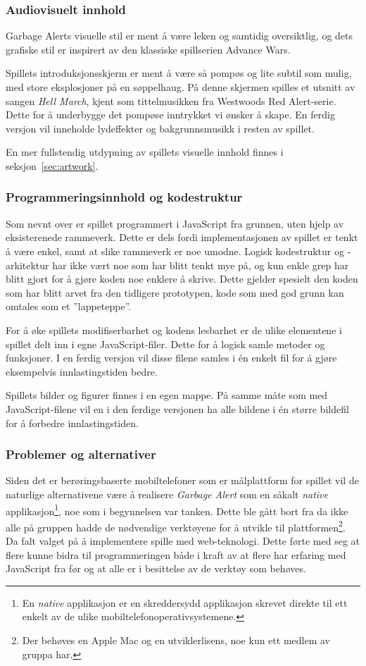 \subsubsection{Audiovisuelt innhold}
{Garbage Alerts} visuelle stil er ment å være leken og samtidig
oversiktlig, og dets grafiske stil er inspirert av den klassiske
spillserien Advance Wars.

Spillets introduksjonsskjerm er ment å være så pompøs og lite subtil som
mulig, med store eksplosjoner på en søppelhaug. På denne skjermen
spilles et utsnitt av sangen \emph{Hell March}, kjent som tittelmusikken
fra Westwoods Red Alert-serie. Dette for å underbygge det pompøse
inntrykket vi ønsker å skape. En ferdig versjon vil inneholde
lydeffekter og bakgrunnsmusikk i resten av spillet.

En mer fullstendig utdypning av spillets visuelle innhold finnes i
seksjon~\ref{sec:artwork}.


\subsubsection{Programmeringsinnhold og kodestruktur}
Som nevnt over er spillet programmert i JavaScript fra grunnen, uten
hjelp av eksisterenede rammeverk. Dette er dels fordi
implementasjonen av spillet er tenkt å være enkel, samt at slike
rammeverk er noe umodne.  Logisk kodestruktur og -arkitektur har ikke
vært noe som har blitt tenkt mye på, og kun enkle grep har blitt gjort
for å gjøre koden noe enklere å skrive. Dette gjelder spesielt den koden
som har blitt arvet fra den tidligere prototypen, kode som med god grunn
kan omtales som et ''lappeteppe''.

For å øke spillets modifiserbarhet og kodens lesbarhet er de ulike
elementene i spillet delt inn i egne JavaScript-filer. Dette for å
logisk samle metoder og funksjoner. I en ferdig versjon vil disse filene
samles i én enkelt fil for å gjøre eksempelvis innlastingstiden bedre.

Spillets bilder og figurer finnes i en egen mappe. På samme måte som med
JavaScript-filene vil en i den ferdige versjonen ha alle bildene i én
større bildefil for å forbedre innlastingstiden.


\subsubsection{Problemer og alternativer}
Siden det er berøringsbaserte mobiltelefoner som er målplattform for
spillet vil de naturlige alternativene være å realisere \emph{Garbage Alert}
som en såkalt \emph{native} applikasjon\footnote{En \emph{native}
applikasjon er en skreddersydd applikasjon skrevet direkte til ett
enkelt av de ulike mobiltelefonoperativsystemene.}, noe som i
begynnelsen var tanken. Dette ble gått bort fra da ikke alle på gruppen
hadde de nødvendige verktøyene for å utvikle til
plattformen\footnote{Der behøves en Apple Mac og en utviklerlisens, noe
kun ett medlem av gruppa har.}. Da falt valget på å implementere
spille med web-teknologi. Dette førte med seg at flere kunne bidra til
programmeringen både i kraft av at flere har erfaring med JavaScript
fra før og at alle er i besittelse av de verktøy som behøves.

